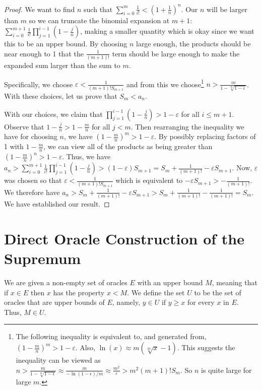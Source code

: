 \documentclass[12pt]{article}
\begin{document}
\begin{proof}
 We want to find $n$ such that $\sum_{i=0}^m \frac{1}{i!} < (1+\frac{1}{n})^n$. Our $n$ will be larger than $m$ so we can truncate the binomial expansion at $m+1$: $\sum_{i=0}^{m+1} \frac{1}{i!} \prod_{j=1}^{i-1} (1-\tfrac{j}{n})$, making a smaller quantity which is okay since we want this to be an upper bound. By choosing $n$ large enough, the products should be near enough to 1 that the $\frac{1}{(m+1)!}$ term should be large enough to make the expanded sum larger than the sum to $m$. 

 Specifically, we choose $\varepsilon < \frac{1}{(m+1)! S_{m+1}  }$ and from this we choose\footnote{The  following inequality is equivalent to, and generated from, $(1-\tfrac{m}{n})^m > 1 - \varepsilon$. Also, $\ln(x) \approx m (\sqrt[m]{x} -1)$. This suggests the inequality can be viewed as $n > \frac{m}{1 - \sqrt[m]{1-\epsilon}} \approx \frac{m}{-\ln(1 - \epsilon)/m} \approx \frac{m^2}{\varepsilon} > m^2 (m+1)! S_m$. So $n$ is quite large for large $m$.}  $n > \frac{m}{ 1 - \sqrt[m]{1-\varepsilon}}$. With these choices, let us prove that $S_m < a_n$. 
 
 With our choices, we claim that $\prod_{j=1}^{i-1} (1-\tfrac{j}{n}) > 1-\varepsilon$ for all $i \leq m+1$. Observe that $1-\tfrac{j}{n} > 1 -\tfrac{m}{n}$ for all $j < m$. Then rearranging the inequality we have for choosing $n$, we have $(1 - \tfrac{m}{n})^m > 1 - \varepsilon $. By possibly replacing factors of 1 with $1-\tfrac{m}{n}$, we can view all of the products as being greater than $(1 - \tfrac{m}{n})^n > 1-\varepsilon$.  Thus, we have 
 $a_n >  \sum_{i=0}^{m+1} \frac{1}{i!} \prod_{j=1}^{i-1} (1-\tfrac{j}{n}) > (1-\varepsilon) S_{m+1} = S_m + \frac{1}{(m+1)!} - \varepsilon S_{m+1}$.  Now, $\varepsilon$ was chosen so that $\varepsilon < \frac{1}{(m+1)! S_{m+1}}$ which is equivalent to $- \varepsilon S_{m+1} > -\frac{1}{(m+1)!}$. We therefore have $a_n > S_m + \frac{1}{(m+1)!} - \varepsilon S_{m+1} > S_m + \frac{1}{(m+1)!} - \frac{1}{(m+1)!} = S_m$. We have established our result. 
\end{proof}




\section{Direct Oracle Construction of the Supremum}\label{app:sup}

We are given a non-empty set of oracles $E$ with an upper bound $M$, meaning that if $x \in E$ then $x$ has the property $x < M$. We define the set $U$ to be the set of oracles that are upper bounds of $E$, namely, $y \in U$ if $y \geq x$ for every $x$ in $E$.  Thus, $M \in U$.
\end{document}

